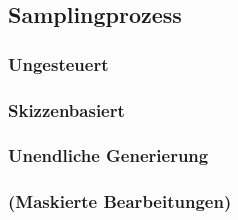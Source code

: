 \subsection {Samplingprozess}

\subsubsection {Ungesteuert}

\subsubsection {Skizzenbasiert}


\subsubsection {Unendliche Generierung}

\subsubsection {(Maskierte Bearbeitungen)}